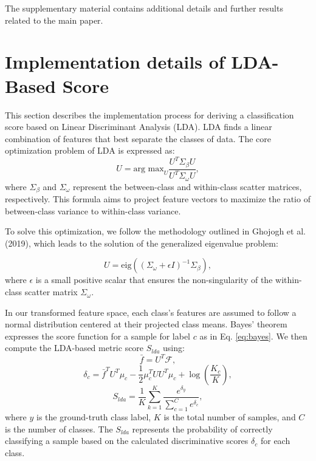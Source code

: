 

The supplementary material contains additional details and further results related to the main paper.


\section{Implementation details of LDA-Based Score}


This section describes the implementation process for deriving a classification score based on Linear Discriminant Analysis (LDA). LDA finds a linear combination of features that best separate the classes of data. The core optimization problem of LDA is expressed as:
\begin{equation}
    U = \text{arg max}_{U} \frac{U^T \Sigma_{\beta} U}{U^T \Sigma_{\omega} U},
\end{equation}
where \( \Sigma_{\beta} \) and \( \Sigma_{\omega} \) represent the between-class and within-class scatter matrices, respectively. This formula aims to project feature vectors to maximize the ratio of between-class variance to within-class variance.

To solve this optimization, we follow the methodology outlined in Ghojogh et al. (2019), which leads to the solution of the generalized eigenvalue problem:

\begin{equation}
    U = \text{eig}((\Sigma_{\omega} + \epsilon I)^{-1} \Sigma_{\beta}),
\end{equation}
where \( \epsilon \) is a small positive scalar that ensures the non-singularity of the within-class scatter matrix \( \Sigma_{\omega} \).

In our transformed feature space, each class's features are assumed to follow a normal distribution centered at their projected class means. Bayes' theorem expresses the score function for a sample for label \( c \) as in Eq. \ref{eq:bayes}. We then compute the LDA-based metric score \( S_{lda} \) using:
\begin{equation}
    \bar{f} = U^T \mathcal{F},
\end{equation}
\begin{equation}
    \delta_c = \bar{f}^T U^T \mu_c - \frac{1}{2} \mu_c^T U U^T \mu_c + \log(\frac{K_c}{K}),
    \label{eq:bayes}
\end{equation}
\begin{equation}
    S_{lda} = \frac{1}{K} \sum_{k=1}^{K} \frac{e^{\delta_y}}{\sum_{c=1}^{C} e^{\delta_c}},
\end{equation}
where \( y \) is the ground-truth class label, \( K \) is the total number of samples, and \( C \) is the number of classes. The \( S_{lda} \) represents the probability of correctly classifying a sample based on the calculated discriminative scores \( \delta_c \) for each class.



